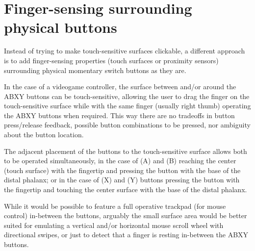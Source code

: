 \documentclass[10pt, twocolumn, a4paper]{article}
\begin{document}
\section{Finger-sensing surrounding\\physical buttons}
\label{solution_1}
    Instead of trying to make touch-sensitive surfaces clickable, a different approach is to add finger-sensing properties (touch surfaces or proximity sensors) surrounding physical momentary switch buttons as they are.

    In the case of a videogame controller, the surface between and/or around the ABXY buttons can be touch-sensitive, allowing the user to drag the finger on the touch-sensitive surface while with the same finger (usually right thumb) operating the ABXY buttons when required. This way there are no tradeoffs in button press/release feedback, possible button combinations to be pressed, nor ambiguity about the button location.

    The adjacent placement of the buttons to the touch-sensitive surface allows both to be operated simultaneously, in the case of (A) and (B) reaching the center (touch surface) with the fingertip and pressing the button with the base of the distal phalanx; or in the case of (X) and (Y) buttons pressing the button with the fingertip and touching the center surface with the base of the distal phalanx.

    While it would be possible to feature a full operative trackpad (for mouse control) in-between the buttons, arguably the small surface area would be better suited for emulating a vertical and/or horizontal mouse scroll wheel with directional swipes, or just to detect that a finger is resting in-between the ABXY buttons.
\end{document}
